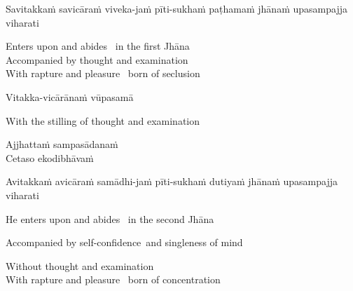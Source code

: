 \begin{pali-hang}
  Savitakkaṁ savicāraṁ viveka-jaṁ pīti-sukhaṁ paṭhamaṁ jhānaṁ upasampajja viharati
\end{pali-hang}

\begin{english-verses}
  Enters upon and abides \breathmark\ in the first Jhāna\\
  Accompanied by thought and examination\\
  With rapture and pleasure \breathmark\ born of seclusion
\end{english-verses}

Vitakka-vicārānaṁ vūpasamā

\begin{english}
  With the stilling of thought and examination
\end{english}

Ajjhattaṁ sampasādanaṁ\\
Cetaso ekodibhāvaṁ
\begin{pali-hang-together}
  Avitakkaṁ avicāraṁ samādhi-jaṁ pīti-sukhaṁ dutiyaṁ jhānaṁ upasampajja viharati
\end{pali-hang-together}

\begin{english-verses}
  He enters upon and abides \breathmark\ in the second Jhāna\\
  \begin{english-hang-together}
  Accompanied by self-confidence\makeatletter\hyperlink{endnote154-appendix}\makeatother \breathmark\ and singleness of mind\\
  \end{english-hang-together}
  Without thought and examination\\
  With rapture and pleasure \breathmark\ born of concentration
\end{english-verses}

